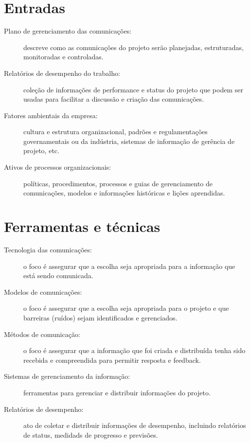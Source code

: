 \section{Entradas}

\begin{description}

	\item[Plano de gerenciamento das comunicações:] descreve como as comunicações do projeto serão planejadas, estruturadas, monitoradas e controladas.
	
	\item[Relatórios de desempenho do trabalho:] coleção de informações de performance e status do projeto que podem ser usadas para facilitar a discussão e criação das comunicações.
	
	\item[Fatores ambientais da empresa:] cultura e estrutura organizacional, padrões e regulamentações governamentais ou da indústria, sistemas de informação de gerência de projeto, etc.
	
	\item[Ativos de processos organizacionais:] políticas, procedimentos, processos e guias de gerenciamento de comunicações, modelos e informações históricas e lições aprendidas.

	
\end{description}

\section{Ferramentas e técnicas}

\begin{description}
	
	\item[Tecnologia das comunicações:] o foco é assegurar que a escolha seja apropriada para a informação que está sendo comunicada.
	
	\item[Modelos de comunicações:] o foco é assegurar que a escolha seja apropriada para o projeto e que barreiras (ruídos) sejam identificados e gerenciados.
	
	\item[Métodos de comunicação:] o foco é assegurar que a informação que foi criada e distribuída tenha sido recebida e compreendida para permitir resposta e feedback.
	
	\item[Sistemas de gerenciamento da informação:] ferramentas para gerenciar e distribuir informações do projeto.
	
	\item[Relatórios de desempenho:] ato de coletar e distribuir informações de desempenho, incluindo relatórios de status, medidads de progresso e previsões.
	
	
\end{description}

